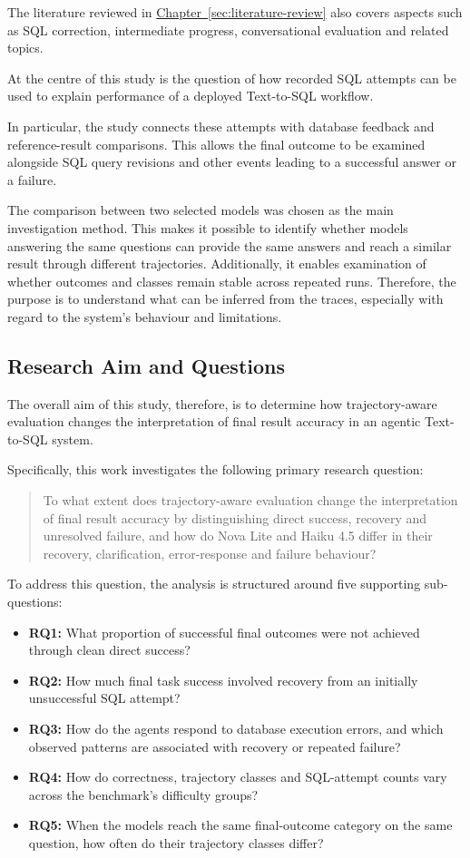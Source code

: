 The literature reviewed in
\hyperref[sec:literature-review]{Chapter~\ref*{sec:literature-review}}
also covers aspects such as SQL correction, intermediate progress, 
conversational evaluation and related topics.

At the centre of this study is the question of 
how recorded SQL attempts can be used 
to explain performance of a deployed Text-to-SQL workflow.

In particular, the study connects these attempts 
with database feedback and reference-result comparisons. 
This allows the final outcome to be examined alongside SQL query revisions 
and other events leading to a successful answer or a failure.

The comparison between two selected models was chosen as the main investigation method.
This makes it possible to identify whether models answering the same questions 
can provide the same answers and reach a similar result through different trajectories.
Additionally, it enables examination of whether outcomes and classes remain stable across repeated runs.
Therefore, the purpose is to understand what can be inferred from the traces, 
especially with regard to the system's behaviour and limitations.

\subsection{Research Aim and Questions}
\label{sec:research-questions}

The overall aim of this study, therefore, is to determine how trajectory-aware evaluation changes
the interpretation of final result accuracy in an agentic Text-to-SQL system.

Specifically, this work investigates the following primary research question:
\begin{quote}
To what extent does trajectory-aware evaluation change the interpretation
of final result accuracy by distinguishing direct success, recovery and
unresolved failure, and how do Nova Lite and Haiku 4.5 differ in their
recovery, clarification, error-response and failure behaviour?
\end{quote}

To address this question, the analysis is structured around five supporting sub-questions:
\begin{itemize}
  \item \textbf{RQ1:} What proportion of successful final outcomes were
  not achieved through clean direct success?
  \item \textbf{RQ2:} How much final task success involved recovery from
  an initially unsuccessful SQL attempt?
  \item \textbf{RQ3:} How do the agents respond to database execution
  errors, and which observed patterns are associated with recovery
  or repeated failure?
  \item \textbf{RQ4:} How do correctness, trajectory classes and
  SQL-attempt counts vary across the benchmark's difficulty groups?
  \item \textbf{RQ5:} When the models reach the same final-outcome
  category on the same question, how often do their trajectory classes differ?
\end{itemize}

